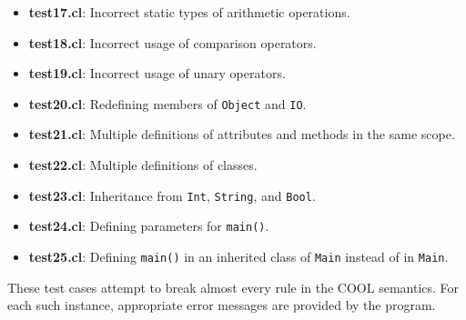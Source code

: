 \documentclass{article}
\begin{document}
\begin{itemize}
	\item \textbf{test17.cl}: Incorrect static types of arithmetic operations.
	\item \textbf{test18.cl}: Incorrect usage of comparison operators.
	\item \textbf{test19.cl}: Incorrect usage of unary operators.
	\item \textbf{test20.cl}: Redefining members of \verb|Object| and \verb|IO|.
	\item \textbf{test21.cl}: Multiple definitions of attributes and methods in the same scope.
	\item \textbf{test22.cl}: Multiple definitions of classes.
	\item \textbf{test23.cl}: Inheritance from \verb|Int|, \verb|String|, and \verb|Bool|.
	\item \textbf{test24.cl}: Defining parameters for \verb|main()|.
	\item \textbf{test25.cl}: Defining \verb|main()| in an inherited class of \verb|Main| instead of in \verb|Main|.
\end{itemize}
These test cases attempt to break almost every rule in the COOL semantics. For each such instance, appropriate error messages are provided by the program.
\end{document}
